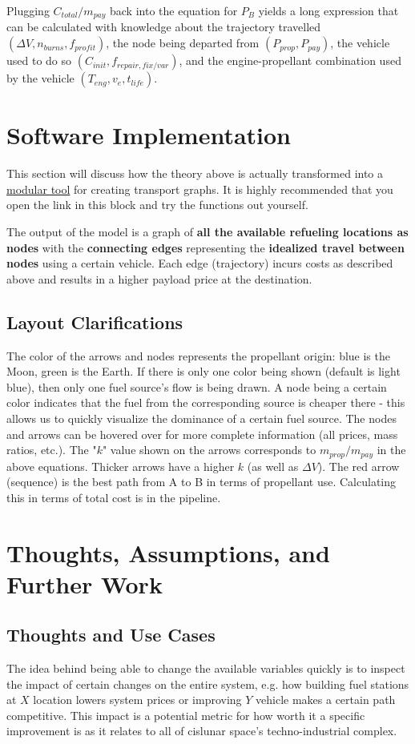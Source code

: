 \documentclass{article}
\begin{document}
Plugging $C_{total} / m_{pay}$ back into the equation for $P_B$ yields a long expression that can be calculated with knowledge about the trajectory travelled $(\Delta V, n_{burns}, f_{profit})$, the node being departed from $(P_{prop}, P_{pay})$, the vehicle used to do so $(C_{init}, f_{repair, fix/var})$, and the engine-propellant combination used by the vehicle $(T_{eng}, v_e, t_{life})$.

\section{Software Implementation}
This section will discuss how the theory above is actually transformed into a \href{https://share.streamlit.io/ulfkemmsies/space_pricing_model/main}{modular tool} for creating transport graphs. It is highly recommended that you open the link in this block and try the functions out yourself.

The output of the model is a graph of \textbf{all the available refueling locations as nodes} with the \textbf{connecting edges} representing the \textbf{idealized travel between nodes} using a certain vehicle. Each edge (trajectory) incurs costs as described above and results in a higher payload price at the destination.

\subsection{Layout Clarifications}
The color of the arrows and nodes represents the propellant origin: blue is the Moon, green is the Earth. If there is only one color being shown (default is light blue), then only one fuel source's flow is being drawn. A node being a certain color indicates that the fuel from the corresponding source is cheaper there - this allows us to quickly visualize the dominance of a certain fuel source. The nodes and arrows can be hovered over for more complete information (all prices, mass ratios, etc.). The "$k$" value shown on the arrows corresponds to $m_{prop}/m_{pay}$ in the above equations. Thicker arrows have a higher $k$ (as well as $\Delta V$). The red arrow (sequence) is the best path from A to B in terms of propellant use. Calculating this in terms of total cost is in the pipeline.

\section{Thoughts, Assumptions, and Further Work}
\subsection{Thoughts and Use Cases}
The idea behind being able to change the available variables quickly is to inspect the impact of certain changes on the entire system, e.g. how building fuel stations at $X$ location lowers system prices or improving $Y$ vehicle makes a certain path competitive. This impact is a potential metric for how worth it a specific improvement is as it relates to all of cislunar space's techno-industrial complex.
\end{document}
